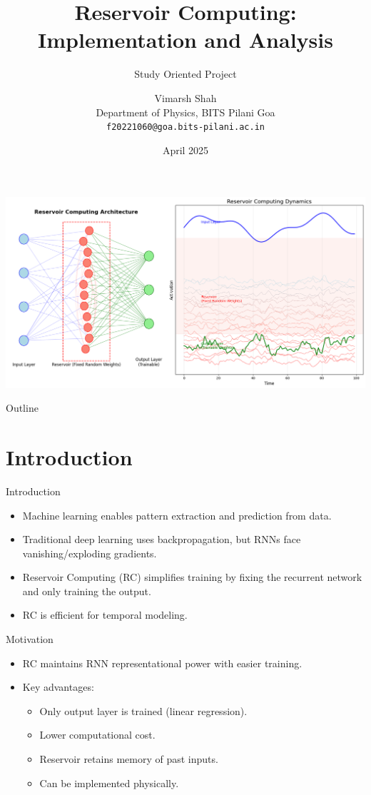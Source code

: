 \documentclass{beamer}
\title{Reservoir Computing: Implementation and Analysis}
\subtitle{Study Oriented Project}
\author{Vimarsh Shah\\Department of Physics, BITS Pilani Goa\\\texttt{f20221060@goa.bits-pilani.ac.in}}
\date{April 2025}
\institute{BITS Pilani, KK Birla Goa Campus}
\begin{document}
\begin{frame}
  \titlepage
  \begin{center}
    \includegraphics[width=0.7\linewidth]{ivt-style/rc_intro_matplotlib}
  \end{center}
\end{frame}

\begin{frame}{Outline}
  \tableofcontents
\end{frame}

\section{Introduction}
\begin{frame}{Introduction}
  \begin{itemize}
    \item Machine learning enables pattern extraction and prediction from data.
    \item Traditional deep learning uses backpropagation, but RNNs face vanishing/exploding gradients.
    \item Reservoir Computing (RC) simplifies training by fixing the recurrent network and only training the output.
    \item RC is efficient for temporal modeling.
  \end{itemize}
\end{frame}

\begin{frame}{Motivation}
  \begin{itemize}
    \item RC maintains RNN representational power with easier training.
    \item Key advantages:
      \begin{itemize}
        \item Only output layer is trained (linear regression).
        \item Lower computational cost.
        \item Reservoir retains memory of past inputs.
        \item Can be implemented physically.
      \end{itemize}
  \end{itemize}
\end{frame}
\end{document}
